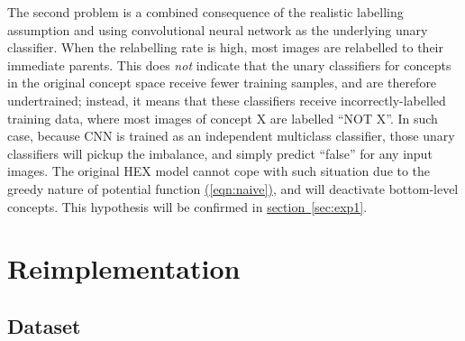 \documentclass[11pt,a4paper]{article}
\begin{document}
The second problem is a combined consequence of the realistic labelling assumption and using convolutional neural network as the underlying unary classifier. When the relabelling rate is high, most images are relabelled to their immediate parents. This does \emph{not} indicate that the unary classifiers for concepts in the original concept space receive fewer training samples, and are therefore undertrained; instead, it means that these classifiers receive incorrectly-labelled training data, where most images of concept X are labelled ``NOT X''. In such case, because CNN is trained as an independent multiclass classifier, those unary classifiers will pickup the imbalance, and simply predict ``false'' for any input images. The original HEX model cannot cope with such situation due to the greedy nature of potential function \hyperref[eqn:naive]{(\ref{eqn:naive})}, and will deactivate bottom-level concepts. This hypothesis will be confirmed in \hyperref[sec:exp1]{section~\ref{sec:exp1}}.

\clearpage
\section{Reimplementation}
\subsection{Dataset}
\label{sec:data}
\end{document}
